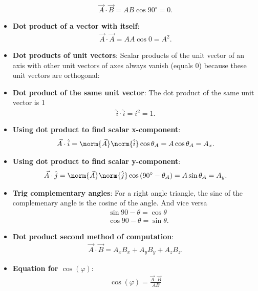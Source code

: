 \documentclass{report}
\begin{document}
\begin{itemize}
\begin{align*}
            \vec{A} \cdot \vec{B} = AB\cos{90^{\circ}} =  0
        .\end{align*}
    \item \textbf{Dot product of a vector with itself}:
        \begin{align*}
            \vec{A} \cdot \vec{A} = AA\cos{0} = A^{2}
        .\end{align*}
    \item \textbf{Dot products of unit vectors}: Scalar products of the unit vector of an axis with other unit vectors of axes always vanish (equals 0) because these unit vectors are orthogonal:
    \item \textbf{Dot product of the same unit vector}: The dot product of the same unit vector is 1
        \begin{align*}
            \hat{i} \cdot \hat{i} = i^{2} = 1
        .\end{align*}
    \item \textbf{Using dot product to find scalar x-component}:
        \begin{align*}
            \vec{A} \cdot \hat{i} = \norm{\vec{A}} \norm{\hat{i}}\cos{\theta_{A}} = A\cos{\theta_{A}}= A_{x}
        .\end{align*}
    \item \textbf{Using dot product to find scalar y-component}:
        \begin{align*}
            \vec{A} \cdot \hat{j} = \norm{\vec{A}} \norm{\hat{j}}\cos{(90^{\circ} -\theta_{A})}= A\sin{\theta_{A}} = A_{y}
        .\end{align*}
    \item \textbf{Trig complementary angles}: For a right angle triangle, the sine of the complemenary angle is the cosine of the angle. And vice versa
        \begin{align*}
            &\sin{90-\theta} = \cos{\theta} \\
            &\cos{90-\theta} = \sin{\theta}
        .\end{align*}
    \item \textbf{Dot product second method of computation}:
        \begin{align*}
            \vec{A} \cdot \vec{B} = A_{x}B_{x} + A_{y}B_{y} + A_{z}B_{z}
        .\end{align*}
    \item \textbf{Equation for $\cos{(\varphi)}$}:
        \begin{align*}
            \cos{(\varphi)} = \frac{\vec{A} \cdot \vec{B}}{AB}

\end{align*}
\end{itemize}
\end{document}
